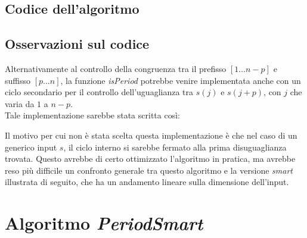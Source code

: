 \documentclass[11pt,a4paper]{article}
\begin{document}
\subsection{Codice dell'algoritmo}  
 

\subsection{Osservazioni sul codice}

Alternativamente al controllo della congruenza tra il prefisso $[1 \dots n-p]$ e suffisso $[p \dots n]$, la funzione \textit{isPeriod} potrebbe venire implementata anche con un ciclo secondario per il controllo dell'uguaglianza tra $s(j)$ e $s(j+p)$, con $j$ che varia da $1$ a $n-p$.\\
Tale implementazione sarebbe stata scritta così:
 
Il motivo per cui non è stata scelta questa implementazione è che nel caso di un generico input $s$, il ciclo interno si sarebbe fermato alla prima disuguaglianza trovata. Questo avrebbe di certo ottimizzato l'algoritmo in pratica, ma avrebbe reso più difficile un confronto generale tra questo algoritmo e la versione \textit{smart} illustrata di seguito, che ha un andamento lineare sulla dimensione dell'input.


\section{Algoritmo \textit{PeriodSmart}}
\end{document}
